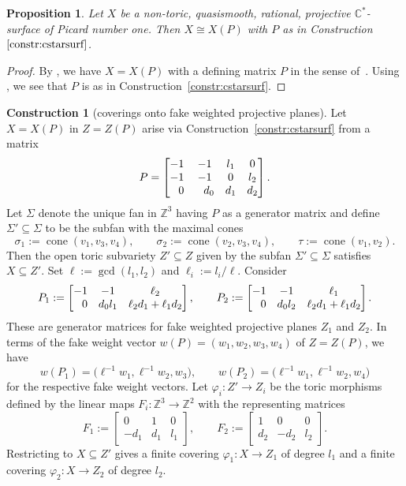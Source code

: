 \documentclass[10pt,a4paper]{amsart}
\newtheorem{prop}[thm]{Proposition}
\theoremstyle{definition}
\newtheorem{constr}[thm]{Construction}
\def\CC{{\mathbb C}}
\def\ZZ{{\mathbb Z}}
\DeclareMathOperator{\cone}{cone}
\begin{document}
\begin{prop}
\label{prop:allqs}
Let $X$ be a non-toric, quasismooth, rational, projective $\CC^*$-surface
of Picard number one.
Then $X \cong X(P)$ with $P$ as in Construction~$\ref{constr:cstarsurf}$.
\end{prop}


\begin{proof}
By \cite[Theorem~4.18]{HaHaHaSp}, we have $X=X(P)$ with a
defining matrix $P$ in the sense of~\cite[Construction~4.2]{HaHaHaSp}.
Using \cite[Propositions~4.9, 4.15 and~5.1]{HaHaHaSp}, we see that
$P$ is as in Construction~\ref{constr:cstarsurf}.
\end{proof}

\begin{constr}[coverings onto fake weighted projective planes]
\label{constr:covs}
Let $X \!=\! X(P)$ in ${Z\!=\!Z(P)}$ arise via
Construction~\ref{constr:cstarsurf} from
a matrix
\[
P
 =
\begin{bmatrix}
-1 & -1 & l_1 & 0
\\
-1 & -1 & 0 & l_2
\\
\hphantom{-}0 & \hphantom{-}d_0 & d_1 & d_2
\end{bmatrix}.
\]
Let $\Sigma$ denote the unique fan in $\ZZ^3$ having $P$
as a generator matrix
and define $\Sigma' \subseteq \Sigma$ to be the subfan
with the maximal cones
\[
\sigma_1 := \cone(v_1,v_3,v_4),
\qquad
\sigma_2 := \cone(v_2,v_3,v_4),
\qquad
\tau := \cone(v_1,v_2).
\]
Then the open toric subvariety $Z' \subseteq Z$ given
by the subfan $\Sigma' \subseteq \Sigma$ satisfies
$X \subseteq Z'$.
Set $\ell := \gcd(l_1,l_2)$ and $\ell_i := l_i/\ell$.
Consider
\[
P_1
 :=
\begin{bmatrix}
-1 & -1 & \ell_2
\\
\hphantom{-}0 & d_0l_1 & \ell_2d_1 + \ell_1d_2
\end{bmatrix},
\qquad
P_2
 :=
\begin{bmatrix}
-1 & -1 & \ell_1
\\
\hphantom{-}0 & d_0l_2 & \ell_2d_1 + \ell_1d_2
\end{bmatrix}.
\]
These are generator matrices for fake weighted
projective planes $Z_1$ and $Z_2$.
In terms of the fake weight vector
$w(P) = (w_1,w_2,w_3,w_4)$ of $Z=Z(P)$, we have
\[
w(P_1) = \bigl(\ell^{-1}w_1, \ell^{-1}w_2, w_3\bigr),
\qquad
w(P_2) = \bigl(\ell^{-1}w_1, \ell^{-1}w_2, w_4\bigr)
\]
for the respective fake weight vectors.
Let $\varphi_i \colon Z' \to Z_i$ be the toric
morphisms defined by the linear maps $
F_i \colon \ZZ^3 \to \ZZ^2$
with the representing matrices
\[
F_1
 :=
\begin{bmatrix}
 0 & 1 & 0
\\
-d_1 & d_1 & l_1
\end{bmatrix},
\qquad
F_2
 :=
\begin{bmatrix}
1 & 0 & 0
\\
d_2 & -d_2 & l_2
\end{bmatrix}.
\]
Restricting to $X \subseteq Z'$ gives a finite
covering $\varphi_1 \colon X \to Z_1$ of degree $l_1$
and a finite covering $\varphi_2 \colon X \to Z_2$
of degree $l_2$.
\end{constr}
\end{document}
